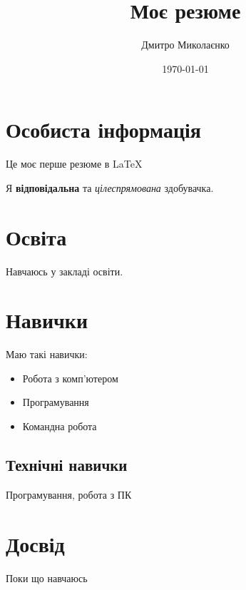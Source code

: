 \documentclass[12pt]{article}
\title{Моє резюме}
\author{Дмитро Миколаєнко}
\date{\today}
\begin{document}
\maketitle
\tableofcontents

\section{Особиста інформація}

\begin{center}
Це моє перше резюме в LaTeX
\end{center}

Я \textbf{відповідальна} та \textit{цілеспрямована} здобувачка.

\section{Освіта}
Навчаюсь у закладі освіти.

\section{Навички}
Маю такі навички:

\begin{itemize}
\item Робота з комп’ютером
\item Програмування
\item Командна робота
\end{itemize}

\subsection{Технічні навички}
Програмування, робота з ПК

\section{Досвід}
Поки що навчаюсь
\end{document}
